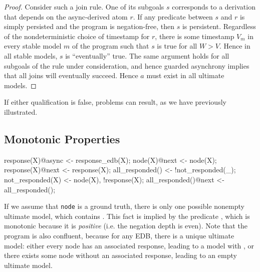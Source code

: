 \begin{proof}
Consider such  a join rule.  One of its subgoals $s$ corresponds to a derivation that depends
on the async-derived atom $r$.  If any predicate between $s$ and $r$ is simply persisted and 
the program is negation-free,
then $s$ is persistent.  Regardless of the nondeterministic choice of timestamp for $r$, there
is some timestamp $V_m$ in every stable model $m$ of the program such that $s$ is true
for all $W > V$.  Hence in all stable models, $s$ is ``eventually'' true.  The same argument holds
for all subgoals of the rule under consideration, and hence guarded asynchrony implies that
all joins will eventually succeed.
Hence $a$ must exist in all ultimate models.

\end{proof}


If either qualification is false, problems can result, as we have previously illustrated.


\subsection{Monotonic Properties}


\begin{example}
\begin{Dedalus}
response(X)@async <- response_edb(X);
node(X)@next <- node(X);
response(X)@next <- response(X);
all_responded() <- !not_responded(_);
not_responded(X) <- node(X), !response(X);
all_responded()@next <- all_responded();
\end{Dedalus}
\end{example}


If we assume that 
\texttt{node} is a ground truth,
there is only one possible nonempty ultimate model, which contains .
This fact is implied by the predicate , which 
is monotonic because it is {\em positive} (i.e. the negation depth is even). 
Note that the program is also confluent, because for any EDB, there is a unique ultimate model: either every node has an associated response, leading to a model with , or there exists some node without an associated response, leading to an empty ultimate model.

